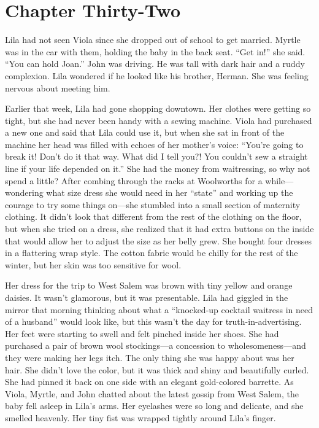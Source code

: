 \documentclass[
  american,
  letterpaper,
]{book}
\begin{document}

\chapter{Chapter Thirty-Two}\label{chapter-thirty-two}

Lila had not seen Viola since she dropped out of school to get married.
Myrtle was in the car with them, holding the baby in the back seat.
``Get in!'' she said. ``You can hold Joan.'' John was driving. He was
tall with dark hair and a ruddy complexion. Lila wondered if he looked
like his brother, Herman. She was feeling nervous about meeting him.

Earlier that week, Lila had gone shopping downtown. Her clothes were
getting so tight, but she had never been handy with a sewing machine.
Viola had purchased a new one and said that Lila could use it, but when
she sat in front of the machine her head was filled with echoes of her
mother's voice: ``You're going to break it! Don't do it that way. What
did I tell you?! You couldn't sew a straight line if your life depended
on it.'' She had the money from waitressing, so why not spend a little?
After combing through the racks at Woolworths for a while---wondering
what size dress she would need in her ``state'' and working up the
courage to try some things on---she stumbled into a small section of
maternity clothing. It didn't look that different from the rest of the
clothing on the floor, but when she tried on a dress, she realized that
it had extra buttons on the inside that would allow her to adjust the
size as her belly grew. She bought four dresses in a flattering wrap
style. The cotton fabric would be chilly for the rest of the winter, but
her skin was too sensitive for wool.

Her dress for the trip to West Salem was brown with tiny yellow and
orange daisies. It wasn't glamorous, but it was presentable. Lila had
giggled in the mirror that morning thinking about what a ``knocked-up
cocktail waitress in need of a husband'' would look like, but this
wasn't the day for truth-in-advertising. Her feet were starting to swell
and felt pinched inside her shoes. She had purchased a pair of brown
wool stockings---a concession to wholesomeness---and they were making
her legs itch. The only thing she was happy about was her hair. She
didn't love the color, but it was thick and shiny and beautifully
curled. She had pinned it back on one side with an elegant gold-colored
barrette. As Viola, Myrtle, and John chatted about the latest gossip
from West Salem, the baby fell asleep in Lila's arms. Her eyelashes were
so long and delicate, and she smelled heavenly. Her tiny fist was
wrapped tightly around Lila's finger.
\end{document}
